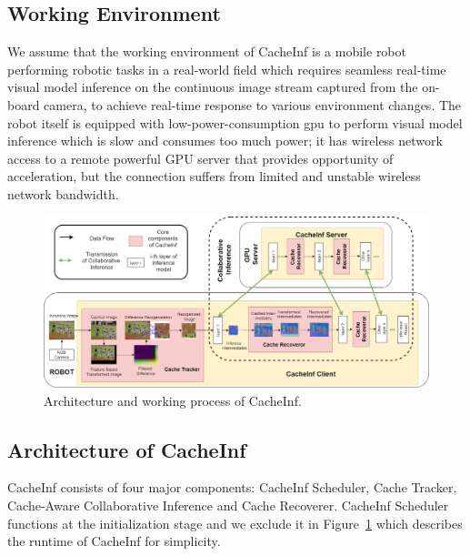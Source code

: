 
\subsection{Working Environment}
We assume that the working environment of CacheInf is a mobile robot performing robotic tasks in a real-world field which requires seamless real-time visual model inference on the continuous image stream captured from the on-board camera, to achieve real-time response to various environment changes.
The robot itself is equipped with low-power-consumption gpu to perform visual model inference which is slow and consumes too much power; it has wireless network access to a remote powerful GPU server that provides opportunity of acceleration, but the connection suffers from limited and unstable wireless network bandwidth.


\begin{figure}[!htb]
    \centering
    \includegraphics[width=\linewidth]{fig/overview.png}
    \caption[track]{Architecture and working process of CacheInf.}
    \label{fig:overview}
\end{figure}

\subsection{Architecture of CacheInf}
CacheInf consists of four major components: CacheInf Scheduler, Cache Tracker, Cache-Aware Collaborative Inference and Cache Recoverer.
CacheInf Scheduler functions at the initialization stage and we exclude it in Figure~\ref{fig:overview} which describes the runtime of CacheInf for simplicity.

